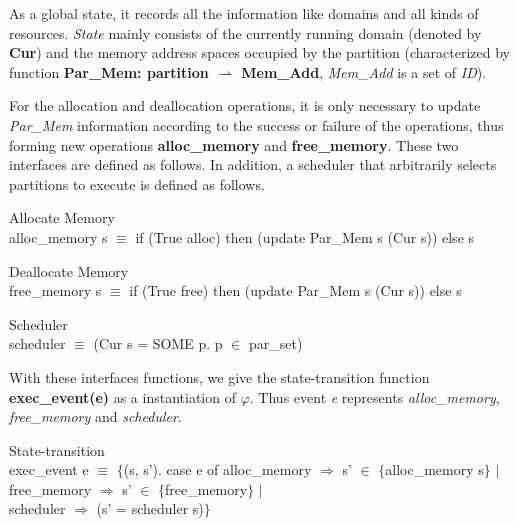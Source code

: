 \documentclass[runningheads]{llncs}
\begin{document}
As a global state, it records all the information like domains and all kinds of resources. \textsl{State} mainly consists of the currently running domain (denoted by \textbf{Cur}) and the memory address spaces occupied by the partition (characterized by function \textbf{Par\_Mem: partition $\rightharpoonup$ Mem\_Add}, \textsl{Mem\_Add} is a set of \textsl{ID}).

For the allocation and deallocation operations, it is only necessary to update \textsl{Par\_Mem} information according to the success or failure of the operations, thus forming new operations \textbf{alloc\_memory} and \textbf{free\_memory}. These two interfaces are defined as follows. In addition, a scheduler that arbitrarily selects partitions to execute is defined as follows.

\begin{definition} {Allocate Memory} \\
alloc\_memory s $\equiv$ if (True alloc) then (update Par\_Mem s (Cur s)) else s
\end{definition}

\begin{definition} {Deallocate Memory} \\
free\_memory s $\equiv$ if (True free) then (update Par\_Mem s (Cur s)) else s
\end{definition}

\begin{definition} {Scheduler} \\
scheduler $\equiv$ (Cur s = SOME p. p $\in$ par\_set)
\end{definition}

With these interfaces functions, we give the state-transition function \textbf{exec\_event(e)} as a instantiation of $\varphi$. Thus event \textsl{e} represents \textsl{alloc\_memory}, \textsl{free\_memory} and \textsl{scheduler}.

\begin{definition} {State-transition} \\
exec\_event e $\equiv$ $\lbrace$(s, s'). case e of alloc\_memory $\Rightarrow$ s' $\in$ $\lbrace$alloc\_memory s$\rbrace$ $\vert$ \\
\phantom{x} \hspace{134pt} free\_memory $\Rightarrow$ s' $\in$ $\lbrace$free\_memory$\rbrace$ $\vert$ \\
\phantom{x} \hspace{134pt} scheduler $\Rightarrow$ (s' = scheduler s)$\rbrace$
\end{definition}
\end{document}
